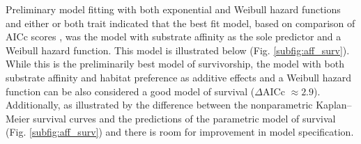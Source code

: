 \documentclass[12pt,letterpaper]{article}
\begin{document}
Preliminary model fitting with both exponential and Weibull hazard functions and either or both trait indicated that the best fit model, based on comparison of AICc scores \citep{Hurvich1989,Akaike1974,Burnham2002a}, was the model with substrate affinity as the sole predictor and a Weibull hazard function. This model is illustrated below (Fig. \ref{subfig:aff_surv}). While this is the preliminarily best model of survivorship, the model with both substrate affinity and habitat preference as additive effects and a Weibull hazard function can be also considered a good model of survival (\(\Delta\)AICc \(\approx 2.9\)). Additionally, as illustrated by the difference between the nonparametric Kaplan--Meier survival curves and the predictions of the parametric model of survival (Fig. \ref{subfig:aff_surv}) and there is room for improvement in model specification.
\end{document}
